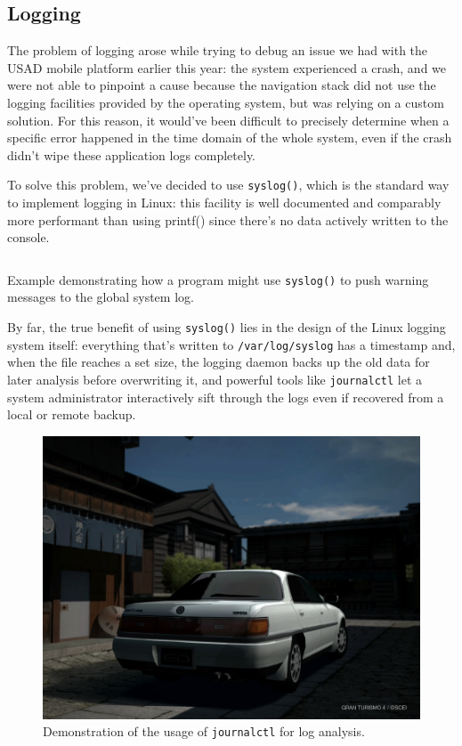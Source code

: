 \documentclass[a4paper,12pt]{report}
\begin{document}

\subsection{Logging}

The problem of logging arose while trying to debug an issue we had with the USAD mobile platform earlier this year: the system experienced a crash, and we were not able to pinpoint a cause because the navigation stack did not use the logging facilities provided by the operating system, but was relying on a custom solution. For this reason, it would've been difficult to precisely determine when a specific error happened in the time domain of the whole system, even if the crash didn't wipe these application logs completely.

To solve this problem, we've decided to use \texttt{syslog()}, which is the standard way to implement logging in Linux: this facility is well documented and comparably more performant than using printf() since there's no data actively written to the console.

\begin{listing}[H]
\inputminted[frame=single,framesep=10pt]{c}{snippets/syslog-example.c}
\caption{Example demonstrating how a program might use \texttt{syslog()} to push warning messages to the global system log.}
\end{listing}

By far, the true benefit of using \texttt{syslog()} lies in the design of the Linux logging system itself: everything that's written to \texttt{/var/log/syslog} has a timestamp and, when the file reaches a set size, the logging daemon backs up the old data for later analysis before overwriting it, and powerful tools like \texttt{journalctl} let a system administrator interactively sift through the logs even if recovered from a local or remote backup.

\begin{figure}[H]
    \centering
    \includegraphics[width=\textwidth]{img/journalctl.jpeg}
    \caption{Demonstration of the usage of \texttt{journalctl} for log analysis.}
\end{figure}
\end{document}
